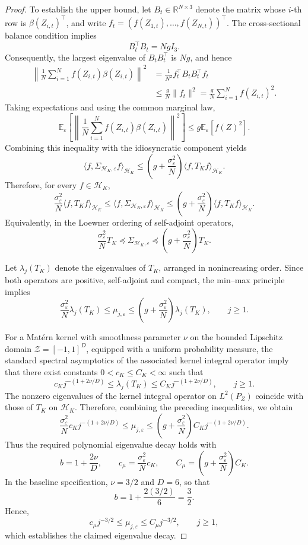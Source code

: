 \begin{proof}
To establish the upper bound, let $B_t\in\mathbb R^{N\times3}$ denote the matrix whose $i$-th row is $\beta(Z_{i,t})^\top$, and write $f_t=(f(Z_{1,t}),\ldots,f(Z_{N,t}))^\top$. The cross-sectional balance condition implies
\[
B_t^\top B_t=NgI_3.
\]
Consequently, the largest eigenvalue of $B_tB_t^\top$ is $Ng$, and hence
\[
\begin{aligned}
\left\|\frac1N\sum_{i=1}^N f(Z_{i,t})\beta(Z_{i,t})\right\|^2
&=\frac1{N^2}f_t^\top B_tB_t^\top f_t\\
&\leq\frac{g}{N}\|f_t\|^2
=\frac{g}{N}\sum_{i=1}^N f(Z_{i,t})^2.
\end{aligned}
\]
Taking expectations and using the common marginal law,
\[
\mathbb E_\varepsilon\left[
\left\|\frac1N\sum_{i=1}^N f(Z_{i,t})\beta(Z_{i,t})\right\|^2
\right]\leq g\mathbb E_\varepsilon[f(Z)^2].
\]
Combining this inequality with the idiosyncratic component yields
\[
\langle f,\Sigma_{\mathcal H_K,\varepsilon}f\rangle_{\mathcal H_K}
\leq\left(g+\frac{\sigma_\varepsilon^2}{N}\right)
\langle f,T_Kf\rangle_{\mathcal H_K}.
\]
Therefore, for every $f\in\mathcal H_K$,
\[
\frac{\sigma_\varepsilon^2}{N}
\langle f,T_Kf\rangle_{\mathcal H_K}
\leq
\langle f,\Sigma_{\mathcal H_K,\varepsilon}f\rangle_{\mathcal H_K}
\leq
\left(g+\frac{\sigma_\varepsilon^2}{N}\right)
\langle f,T_Kf\rangle_{\mathcal H_K}.
\]
Equivalently, in the Loewner ordering of self-adjoint operators,
\[
\frac{\sigma_\varepsilon^2}{N}T_K
\preceq\Sigma_{\mathcal H_K,\varepsilon}
\preceq
\left(g+\frac{\sigma_\varepsilon^2}{N}\right)T_K.
\]

Let $\lambda_j(T_K)$ denote the eigenvalues of $T_K$, arranged in nonincreasing order. Since both operators are positive, self-adjoint and compact, the min--max principle implies
\[
\frac{\sigma_\varepsilon^2}{N}\lambda_j(T_K)
\leq\mu_{j,\varepsilon}
\leq
\left(g+\frac{\sigma_\varepsilon^2}{N}\right)\lambda_j(T_K),
\qquad j\geq1.
\]

For a Matérn kernel with smoothness parameter $\nu$ on the bounded Lipschitz domain $\mathcal Z=[-1,1]^D$, equipped with a uniform probability measure, the standard spectral asymptotics of the associated kernel integral operator imply that there exist constants $0<c_K\leq C_K<\infty$ such that
\[
c_Kj^{-(1+2\nu/D)}
\leq\lambda_j(T_K)
\leq C_Kj^{-(1+2\nu/D)},
\qquad j\geq1.
\]
The nonzero eigenvalues of the kernel integral operator on $L^2(P_Z)$ coincide with those of $T_K$ on $\mathcal H_K$. Therefore, combining the preceding inequalities, we obtain
\[
\frac{\sigma_\varepsilon^2}{N}c_Kj^{-(1+2\nu/D)}
\leq\mu_{j,\varepsilon}
\leq
\left(g+\frac{\sigma_\varepsilon^2}{N}\right)
C_Kj^{-(1+2\nu/D)}.
\]
Thus the required polynomial eigenvalue decay holds with
\[
b=1+\frac{2\nu}{D},
\qquad
c_\mu=\frac{\sigma_\varepsilon^2}{N}c_K,
\qquad
C_\mu=\left(g+\frac{\sigma_\varepsilon^2}{N}\right)C_K.
\]
In the baseline specification, $\nu=3/2$ and $D=6$, so that
\[
b=1+\frac{2(3/2)}6=\frac32.
\]
Hence,
\[
c_\mu j^{-3/2}\leq\mu_{j,\varepsilon}\leq C_\mu j^{-3/2},
\qquad j\geq1,
\]
which establishes the claimed eigenvalue decay.
\end{proof}

